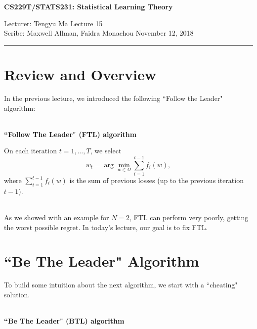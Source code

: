 \documentclass[11pt]{article}
\newcommand{\draftnotice}{\vbox to 0.25in{\noindent
   \raisebox{0.6in}[0in][0in]{\makebox[\textwidth][r]{\it
    DRAFT --- a final version will be posted shortly}}}
   \vspace{-.25in}\vspace{-\baselineskip}
}
\begin{document}
\thispagestyle{empty}


\begin{center}
\bf\large CS229T/STATS231: Statistical Learning Theory
\end{center}

\noindent
Lecturer: Tengyu Ma   %
\hfill
Lecture 15               %
\\
Scribe: Maxwell Allman, Faidra Monachou                 %
\hfill
November 12, 2018           %

\noindent
\rule{\textwidth}{1pt}

\medskip


\section{Review and Overview}

In the previous lecture, we introduced the following ``Follow the Leader" algorithm:
	
~\\\noindent\textbf{``Follow The Leader" (FTL) algorithm }

\noindent On each iteration $t = 1, \ldots, T$, we select 
\begin{equation}
\label{eq:w_t_definition}
w_t = \arg \min_{w \in \Omega} \sum_{i=1}^{t-1} f_i (w),    
\end{equation}
 where $\sum_{i=1}^{t-1} f_i (w)$ is the sum of previous losses (up to the previous iteration $t-1$).

~\\As we showed with an example for $N=2$, FTL can perform very poorly, getting the worst possible regret. 
In today's lecture, our goal is to fix FTL. 



\section{``Be The Leader" Algorithm }

To build some intuition about the next algorithm, we start with a ``cheating" solution.

~\\\noindent\textbf{``Be The Leader" (BTL) algorithm }
\end{document}
